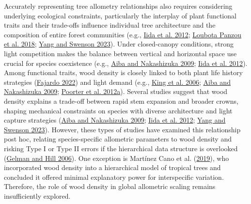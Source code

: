 \documentclass[
  12pt,
  letterpaper,
  DIV=11,
  numbers=noendperiod]{scrartcl}
\begin{document}
Accurately representing tree allometry relationships also requires
considering underlying ecological constraints, particularly the
interplay of plant functional traits and their trade-offs influence
individual tree architecture and the composition of entire forest
communities (e.g., \protect\hyperlink{ref-Iida2012}{Iida et al. 2012};
\protect\hyperlink{ref-LoubotaPanzou2018}{Loubota Panzou et al. 2018};
\protect\hyperlink{ref-Yang2023}{Yang and Swenson 2023}). Under
closed-canopy conditions, strong light competition makes the balance
between vertical and horizontal space use crucial for species
coexistence (e.g., \protect\hyperlink{ref-Aiba2009}{Aiba and Nakashizuka
2009}; \protect\hyperlink{ref-Iida2012}{Iida et al. 2012}). Among
functional traits, wood density is closely linked to both plant life
history strategies (\protect\hyperlink{ref-Fajardo2022a}{Fajardo 2022})
and light demand (e.g., \protect\hyperlink{ref-King2006}{King et al.
2006}; \protect\hyperlink{ref-Aiba2009}{Aiba and Nakashizuka 2009};
\protect\hyperlink{ref-Poorter2012a}{Poorter et al. 2012a}). Several
studies suggest that wood density explains a trade-off between rapid
stem expansion and broader crowns, shaping mechanical constraints on
species with diverse architecture and light capture strategies
(\protect\hyperlink{ref-Aiba2009}{Aiba and Nakashizuka 2009};
\protect\hyperlink{ref-Iida2012}{Iida et al. 2012};
\protect\hyperlink{ref-Yang2023}{Yang and Swenson 2023}). However, these
types of studies have examined this relationship post hoc, relating
species-specific allometric parameters to wood density and risking Type
I or Type II errors if the hierarchical data structure is overlooked
(\protect\hyperlink{ref-Gelman2006}{Gelman and Hill 2006}). One
exception is Martínez Cano et al.
(\protect\hyperlink{ref-MartinezCano2019}{2019}), who incorporated wood
density into a hierarchical model of tropical trees and concluded it
offered minimal explanatory power for interspecific variation.
Therefore, the role of wood density in global allometric scaling remains
insufficiently explored.
\end{document}
